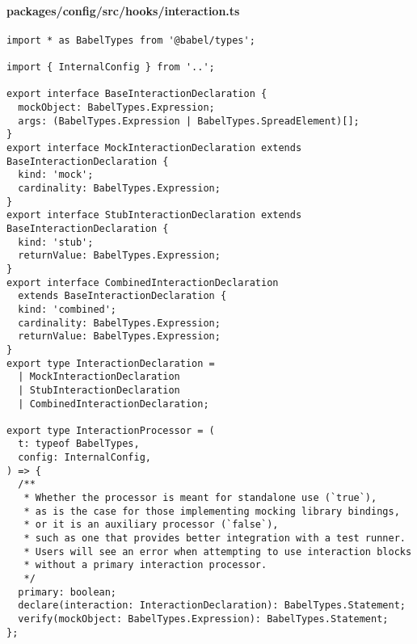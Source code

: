 \paragraph*{packages/config/src/hooks/interaction.ts}
\begin{verbatim}
import * as BabelTypes from '@babel/types';

import { InternalConfig } from '..';

export interface BaseInteractionDeclaration {
  mockObject: BabelTypes.Expression;
  args: (BabelTypes.Expression | BabelTypes.SpreadElement)[];
}
export interface MockInteractionDeclaration extends BaseInteractionDeclaration {
  kind: 'mock';
  cardinality: BabelTypes.Expression;
}
export interface StubInteractionDeclaration extends BaseInteractionDeclaration {
  kind: 'stub';
  returnValue: BabelTypes.Expression;
}
export interface CombinedInteractionDeclaration
  extends BaseInteractionDeclaration {
  kind: 'combined';
  cardinality: BabelTypes.Expression;
  returnValue: BabelTypes.Expression;
}
export type InteractionDeclaration =
  | MockInteractionDeclaration
  | StubInteractionDeclaration
  | CombinedInteractionDeclaration;

export type InteractionProcessor = (
  t: typeof BabelTypes,
  config: InternalConfig,
) => {
  /**
   * Whether the processor is meant for standalone use (`true`),
   * as is the case for those implementing mocking library bindings,
   * or it is an auxiliary processor (`false`),
   * such as one that provides better integration with a test runner.
   * Users will see an error when attempting to use interaction blocks
   * without a primary interaction processor.
   */
  primary: boolean;
  declare(interaction: InteractionDeclaration): BabelTypes.Statement;
  verify(mockObject: BabelTypes.Expression): BabelTypes.Statement;
};
\end{verbatim}

